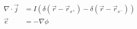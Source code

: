 \begin{equation}
\begin{split}
\nabla \cdot \vec{j} &= I\left(\delta(\vec{r} - \vec{r}_{s^{+}}) - \delta(\vec{r} - \vec{r}_{s^{-}})\right) \\
\vec{e} &= - \nabla \phi
\end{split}
\label{eq:dc_equations}
\end{equation}
